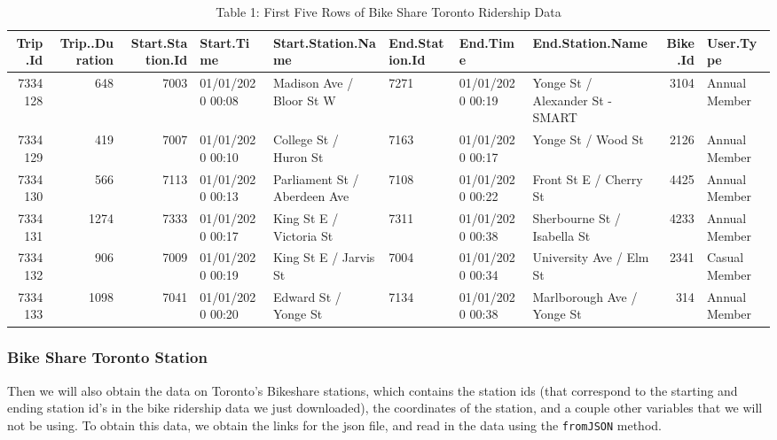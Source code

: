 \documentclass[
]{article}
\begin{document}
\begin{table}[!h]

\caption{\label{tab:Table 1 First Five Rows of Bike Share Toronto Ridership Data}Table 1: First Five Rows of Bike Share Toronto Ridership Data}
\centering
\begin{tabular}[t]{r|r|r|l|l|l|l|l|r|l}
\hline
Trip.Id & Trip..Duration & Start.Station.Id & Start.Time & Start.Station.Name & End.Station.Id & End.Time & End.Station.Name & Bike.Id & User.Type\\
\hline
7334128 & 648 & 7003 & 01/01/2020 00:08 & Madison Ave / Bloor St W & 7271 & 01/01/2020 00:19 & Yonge St / Alexander St - SMART & 3104 & Annual Member\\
\hline
7334129 & 419 & 7007 & 01/01/2020 00:10 & College St / Huron St & 7163 & 01/01/2020 00:17 & Yonge St / Wood St & 2126 & Annual Member\\
\hline
7334130 & 566 & 7113 & 01/01/2020 00:13 & Parliament St / Aberdeen Ave & 7108 & 01/01/2020 00:22 & Front St E / Cherry St & 4425 & Annual Member\\
\hline
7334131 & 1274 & 7333 & 01/01/2020 00:17 & King St E / Victoria St & 7311 & 01/01/2020 00:38 & Sherbourne St / Isabella St & 4233 & Annual Member\\
\hline
7334132 & 906 & 7009 & 01/01/2020 00:19 & King St E / Jarvis St & 7004 & 01/01/2020 00:34 & University Ave / Elm St & 2341 & Casual Member\\
\hline
7334133 & 1098 & 7041 & 01/01/2020 00:20 & Edward St / Yonge St & 7134 & 01/01/2020 00:38 & Marlborough Ave / Yonge St & 314 & Annual Member\\
\hline
\end{tabular}
\end{table}

\hypertarget{bike-share-toronto-station}{%
\subsubsection{Bike Share Toronto
Station}\label{bike-share-toronto-station}}

Then we will also obtain the data on Toronto's Bikeshare stations, which
contains the station ids (that correspond to the starting and ending
station id's in the bike ridership data we just downloaded), the
coordinates of the station, and a couple other variables that we will
not be using. To obtain this data, we obtain the links for the json
file, and read in the data using the \texttt{fromJSON} method.
\end{document}
